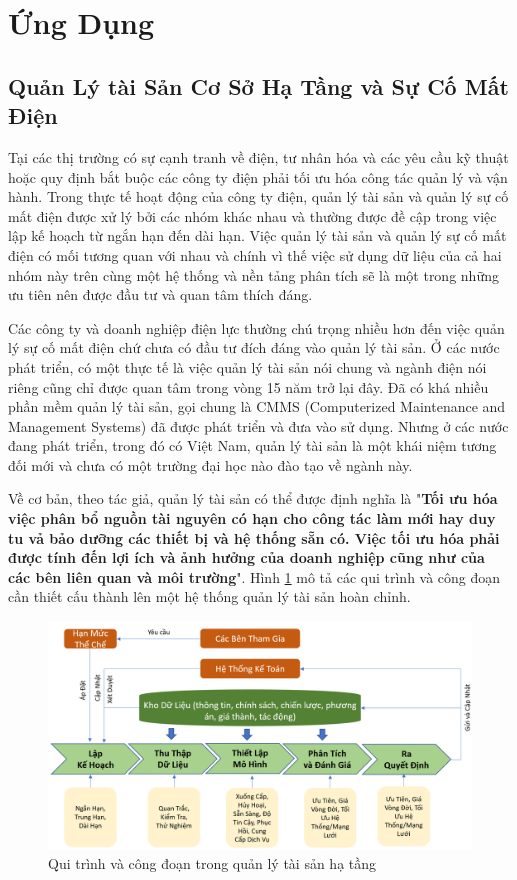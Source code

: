 \documentclass[utf8]{frontiersSCNS} %
\begin{document}
\section{Ứng Dụng}
\subsection{Quản Lý tài Sản Cơ Sở Hạ Tầng và Sự Cố Mất Điện}
Tại các thị trường có sự cạnh tranh về điện, tư nhân hóa và các yêu cầu kỹ thuật hoặc quy định bắt buộc các công ty điện phải tối ưu hóa công tác quản lý và vận hành. Trong thực tế hoạt động của công ty điện, quản lý tài sản và quản lý sự cố mất điện được xử lý bởi các nhóm khác nhau và thường được đề cập trong việc lập kế hoạch từ ngắn hạn đến dài hạn. Việc quản lý tài sản và quản lý sự cố mất điện có mối tương quan với nhau và chính vì thế việc sử dụng dữ liệu của cả hai nhóm này trên cùng một hệ thống và nền tảng phân tích sẽ là một trong những ưu tiên nên được đầu tư và quan tâm thích đáng.

Các công ty và doanh nghiệp điện lực thường chú trọng nhiều hơn đến việc quản lý sự cố mất điện chứ chưa có đầu tư đích đáng vào quản lý tài sản. Ở các nước phát triển, có một thực tế là việc quản lý tài sản nói chung và ngành điện nói riêng cũng chỉ được quan tâm trong vòng 15 năm trở lại đây. Đã có khá nhiều phần mềm quản lý tài sản, gọi chung là CMMS (Computerized Maintenance and Management Systems) đã được phát triển và đưa vào sử dụng. Nhưng ở các nước đang phát triển, trong đó có Việt Nam, quản lý tài sản là một khái niệm tương đối mới và chưa có một trường đại học nào đào tạo về ngành này. 

Về cơ bản, theo tác giả, quản lý tài sản có thể được định nghĩa là "\textbf{Tối ưu hóa việc phân bổ nguồn tài nguyên có hạn cho công tác làm mới hay duy tu vả bảo dưỡng các thiết bị và hệ thống sẵn có. Việc tối ưu hóa phải được tính đến lợi ích và ảnh hưởng của doanh nghiệp cũng như của các bên liên quan và môi trường}". Hình \ref{fig:asset} mô tả các qui trình và công đoạn cần thiết cấu thành lên một hệ thống quản lý tài sản hoàn chỉnh.

\FloatBarrier
\begin{figure}[h]
	\centering
	\begin{center}
		\includegraphics[width=14cm]{assetmanagement}%
	\end{center}
	\caption{Qui trình và công đoạn trong quản lý tài sản hạ tầng}\label{fig:asset}
\end{figure}
\FloatBarrier
\end{document}
